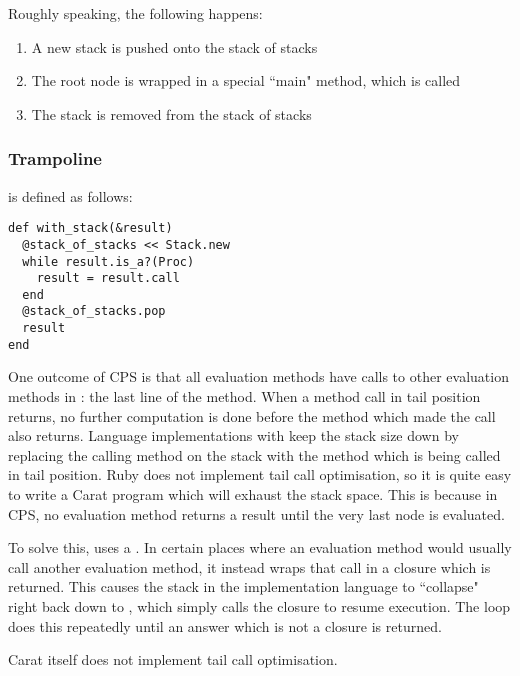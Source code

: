 Roughly speaking, the following happens:

\begin{enumerate}
  \item A new stack is pushed onto the stack of stacks
  \item The root node is wrapped in a special ``main" method, which is called
  \item The stack is removed from the stack of stacks
\end{enumerate}

\subsubsection{Trampoline}

 is defined as follows:

\begin{minipage}{\textwidth}
\begin{lstlisting}
def with_stack(&result)
  @stack_of_stacks << Stack.new
  while result.is_a?(Proc)
    result = result.call
  end
  @stack_of_stacks.pop
  result
end
\end{lstlisting}
\end{minipage}

One outcome of CPS is that all evaluation methods have calls to other evaluation methods in : the last line of the method. When a method call in tail position returns, no further computation is done before the method which made the call also returns. Language implementations with  keep the stack size down by replacing the calling method on the stack with the method which is being called in tail position. Ruby does not implement tail call optimisation, so it is quite easy to write a Carat program which will exhaust the stack space. This is because in CPS, no evaluation method returns a result until the very last node is evaluated.

To solve this,  uses a . In certain places where an evaluation method would usually call another evaluation method, it instead wraps that call in a closure which is returned. This causes the stack in the implementation language to ``collapse" right back down to , which simply calls the closure to resume execution. The  loop does this repeatedly until an answer which is not a closure is returned.

Carat itself does not implement tail call optimisation.


